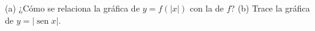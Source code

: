 \setcounter{enumi}{24}
    \item (a) ¿Cómo se relaciona la gráfica de $y = f(|x|)$ con la de $f$?
    (b) Trace la gráfica de $y = |\operatorname{sen} x|$.
